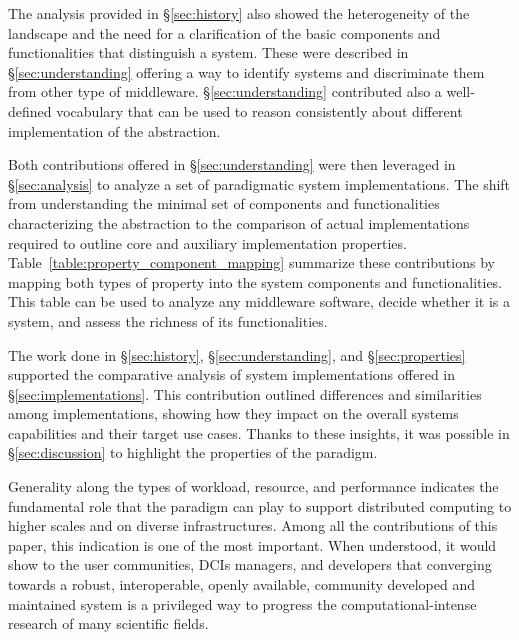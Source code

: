 \documentclass{sig-alternate}
\begin{document}
The analysis provided in \S\ref{sec:history} also showed the heterogeneity of
the \pilot landscape and the need for a clarification of the basic components
and functionalities that distinguish a \pilot system. These were described in
\S\ref{sec:understanding} offering a way to identify \pilot systems and
discriminate them from other type of middleware. \S\ref{sec:understanding}
contributed also a well-defined vocabulary that can be used to reason
consistently about different implementation of the \pilot abstraction.

Both contributions offered in \S\ref{sec:understanding} were then leveraged in
\S\ref{sec:analysis} to analyze a set of paradigmatic \pilot system
implementations. The shift from understanding the minimal set of components and
functionalities characterizing the \pilot abstraction to the comparison of
actual \pilot implementations required to outline core and auxiliary
implementation properties. Table~\ref{table:property_component_mapping}
summarize these contributions by mapping both types of property into the \pilot
system components and functionalities. This table can be used to analyze any
middleware software, decide whether it is a \pilot system, and assess the
richness of its functionalities.

The work done in \S\ref{sec:history}, \S\ref{sec:understanding}, and
\S\ref{sec:properties} supported the comparative analysis of \pilot system
implementations offered in \S\ref{sec:implementations}. This contribution
outlined differences and similarities among implementations, showing how they
impact on the overall \pilot systems capabilities and their target use cases.
Thanks to these insights, it was possible in \S\ref{sec:discussion} to highlight
the properties of the \pilot paradigm.

Generality along the types of workload, resource, and performance indicates the
fundamental role that the \pilot paradigm can play to support distributed
computing to higher scales and on diverse infrastructures. Among all the
contributions of this paper, this indication is one of the most important. When
understood, it would show to the user communities, DCIs managers, and developers
that converging towards a robust, interoperable, openly available, community
developed and maintained \pilot system is a privileged way to progress the
computational-intense research of many scientific fields.


\end{document}

